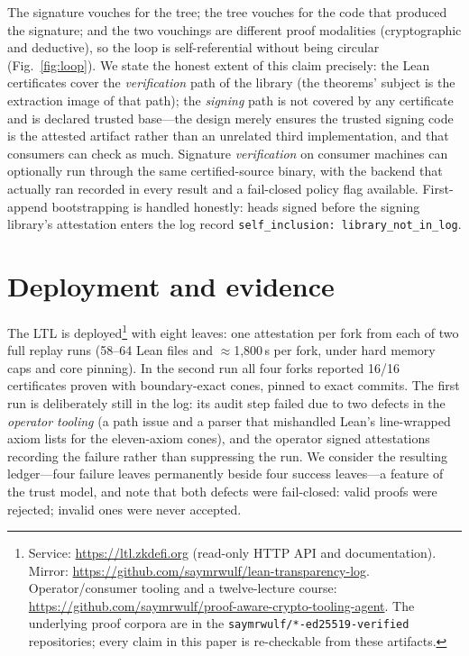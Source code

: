 \documentclass[10pt,twocolumn]{article}
\newcommand{\code}[1]{\texttt{\small #1}}
\begin{document}
\noindent The signature vouches for the tree; the tree vouches for the
code that produced the signature; and the two vouchings are different
proof modalities (cryptographic and deductive), so the loop is
self-referential without being circular
(Fig.~\ref{fig:loop}). We state the honest extent of this claim
precisely: the Lean certificates cover the \emph{verification} path of
the library (the theorems' subject is the extraction image of that
path); the \emph{signing} path is not covered by any certificate and is
declared trusted base---the design merely ensures the trusted signing
code is the attested artifact rather than an unrelated third
implementation, and that consumers can check as much. Signature
\emph{verification} on consumer machines can optionally run through the
same certified-source binary, with the backend that actually ran
recorded in every result and a fail-closed policy flag available.
First-append bootstrapping is handled honestly: heads signed before the
signing library's attestation enters the log record
\code{self\_inclusion:\ library\_not\_in\_log}.



\section{Deployment and evidence}
\label{sec:deploy}

The LTL is deployed\footnote{Service:
\url{https://ltl.zkdefi.org} (read-only HTTP API and
documentation). Mirror: \url{https://github.com/saymrwulf/lean-transparency-log}.
Operator/consumer tooling and a twelve-lecture course:
\url{https://github.com/saymrwulf/proof-aware-crypto-tooling-agent}. The
underlying proof corpora are in the \code{saymrwulf/*-ed25519-verified}
repositories; every claim in this paper is re-checkable from these
artifacts.} with eight leaves: one attestation per fork from each of two
full replay runs (58--64 Lean files and $\approx$1{,}800\,s per
fork, under hard memory caps and core pinning). In the second run all
four forks reported 16/16 certificates proven with boundary-exact cones,
pinned to exact commits. The first run is deliberately still in the log: its audit step
failed due to two defects in the \emph{operator tooling} (a path issue
and a parser that mishandled Lean's line-wrapped axiom lists for the
eleven-axiom cones), and the operator signed attestations recording the
failure rather than suppressing the run. We consider the resulting
ledger---four failure leaves permanently beside four success
leaves---a feature of the trust model, and note that both defects were
fail-closed: valid proofs were rejected; invalid ones were never
accepted.
\end{document}
